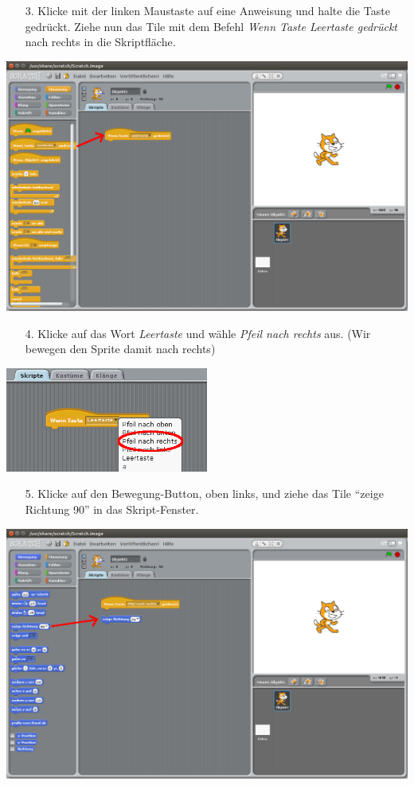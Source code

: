 \begin{itemize}
\item[3.] Klicke mit der linken Maustaste auf eine Anweisung und halte die Taste gedrückt. Ziehe nun das Tile mit dem Befehl
 \textit{Wenn Taste Leertaste gedrückt} nach rechts in die Skriptfläche. 
\end{itemize}
\includegraphics[width=\textwidth]{images/aufgabe1_steuerung_verschieben.png}

\begin{itemize}
\item[4.] Klicke auf das Wort \textit{Leertaste} und wähle \textit{Pfeil nach rechts} aus.  (Wir bewegen den Sprite damit nach rechts)
\end{itemize}
\includegraphics[width=0.5\textwidth]{images/aufgabe1_dropdown.png}

\begin{itemize}
\item[5.] Klicke auf den Bewegung-Button, oben links, und ziehe das Tile “zeige Richtung 90” in das Skript-Fenster.
\end{itemize}
\includegraphics[width=\textwidth]{images/aufgabe1_bewegung_verschieben.png}

